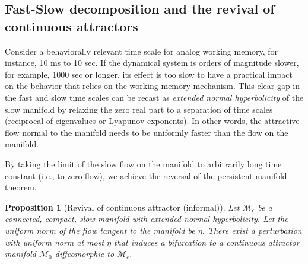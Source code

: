 \documentclass{article} %
\newcounter{ct}
\newcommand{\manifold}{\mathcal{M}}
\newtheorem{prop}{Proposition}
\theoremstyle{definition}
\theoremstyle{remark}
\renewcommand{\cite}{\citep}
\begin{document}
%

\subsection{Fast-Slow decomposition and the revival of continuous attractors}\label{sec:revival}
Consider a behaviorally relevant time scale for analog working memory, for instance, 10 ms to 10 sec.
If the dynamical system is orders of magnitude slower, for example, 1000 sec or longer, its effect is too slow to have a practical impact on the behavior that relies on the working memory mechanism.
This clear gap in the fast and slow time scales can be recast as \emph{extended normal hyperbolicity} of the slow manifold by relaxing the zero real part to a separation of time scales (reciprocal of eigenvalues or Lyapunov exponents).
In other words, the attractive flow normal to the manifold needs to be uniformly faster than the flow on the manifold.

By taking the limit of the slow flow on the manifold to arbitrarily long time constant (i.e., to zero flow), we achieve the reversal of the persistent manifold theorem.
\begin{prop}[Revival of continuous attractor (informal)]\label{prop:revival}
Let $\manifold_\epsilon$ be a connected, compact, slow manifold with extended normal hyperbolicity. %
Let the uniform norm of the flow tangent to the manifold be $\eta$.
There exist a perturbation with uniform norm at most $\eta$ that induces a bifurcation to a continuous attractor manifold $\manifold_0$ diffeomorphic to $\manifold_\epsilon$.
\end{prop}
\end{document}
